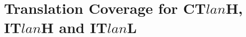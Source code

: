 \documentclass[a4paper,11pt]{article}
\begin{document}
	
	
	\section{Translation Coverage for CT\mbox{\boldmath $lan$}H, IT\mbox{\boldmath $lan$}H and IT\mbox{\boldmath $lan$}L}
	\label{ap:cts}
\end{document}
